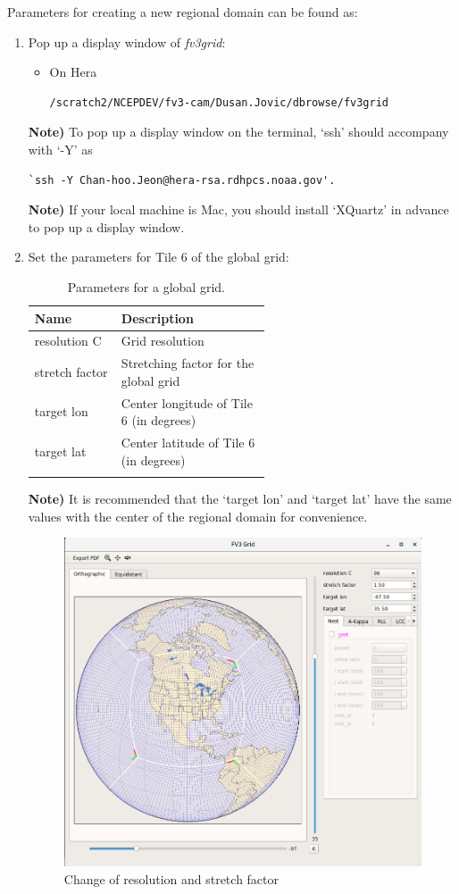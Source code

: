 \documentclass[11pt,fleqn]{report}              %
\begin{document}
Parameters for creating a new regional domain can be found as: 

\begin{enumerate}
\item Pop up a display window of {\it fv3grid}:

\begin{itemize}
\item On Hera
\lstset{language=bash}   
\begin{lstlisting}[frame=trBL]
/scratch2/NCEPDEV/fv3-cam/Dusan.Jovic/dbrowse/fv3grid
\end{lstlisting}
\end{itemize}

{\bf Note)} To pop up a display window on the terminal, `ssh' should accompany with `-Y' as 
\lstset{language=bash}   
\begin{lstlisting}[frame=trBL]
`ssh -Y Chan-hoo.Jeon@hera-rsa.rdhpcs.noaa.gov'. 
\end{lstlisting}
{\bf Note)} If your local machine is Mac, you should install `XQuartz' in advance to pop up a display window.

\item Set the parameters for Tile 6 of the global grid:
{
\fontsize{10}{12}\selectfont
\begin{longtable}{p{0.15\linewidth} | p{0.4\linewidth} }
\hline
\hline
 Name & Description \\
\hline
 resolution C & Grid resolution   \\
 stretch factor & Stretching factor for the global grid \\
 target lon & Center longitude of Tile 6 (in degrees) \\
 target lat & Center latitude of Tile 6 (in degrees) \\
\hline
\caption{Parameters for a global grid.}
\label{table:fv3_var_parent}
\end{longtable}
}

{\bf Note)} It is recommended that the `target lon' and `target lat' have the same values with the center of the regional domain for convenience.

\begin{figure}[ht!]
  \centering
  \includegraphics[width=0.6\linewidth]{post_fv3grid_02.png}
  \caption{Change of resolution and stretch factor}
  \label{fig:post_fv3grid_02}
\end{figure}



\end{enumerate}
\end{document}

